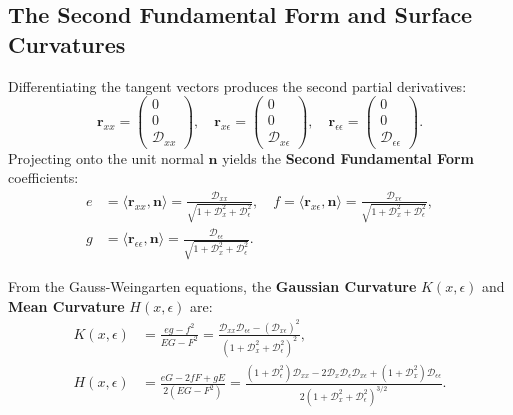 \documentclass[11pt,a4paper]{article}
\theoremstyle{definition}
\begin{document}
\subsection{The Second Fundamental Form and Surface Curvatures}
Differentiating the tangent vectors produces the second partial derivatives:
\begin{equation}
\mathbf{r}_{xx} = \begin{pmatrix} 0 \\ 0 \\ \mathcal{D}_{xx} \end{pmatrix}, \quad \mathbf{r}_{x\epsilon} = \begin{pmatrix} 0 \\ 0 \\ \mathcal{D}_{x\epsilon} \end{pmatrix}, \quad \mathbf{r}_{\epsilon\epsilon} = \begin{pmatrix} 0 \\ 0 \\ \mathcal{D}_{\epsilon\epsilon} \end{pmatrix}.
\end{equation}
Projecting onto the unit normal $\mathbf{n}$ yields the \textbf{Second Fundamental Form} coefficients:
\begin{align}
e &= \langle \mathbf{r}_{xx}, \mathbf{n} \rangle = \frac{\mathcal{D}_{xx}}{\sqrt{1 + \mathcal{D}_x^2 + \mathcal{D}_\epsilon^2}}, \quad 
f = \langle \mathbf{r}_{x\epsilon}, \mathbf{n} \rangle = \frac{\mathcal{D}_{x\epsilon}}{\sqrt{1 + \mathcal{D}_x^2 + \mathcal{D}_\epsilon^2}}, \nonumber \\
g &= \langle \mathbf{r}_{\epsilon\epsilon}, \mathbf{n} \rangle = \frac{\mathcal{D}_{\epsilon\epsilon}}{\sqrt{1 + \mathcal{D}_x^2 + \mathcal{D}_\epsilon^2}}.
\end{align}

From the Gauss-Weingarten equations, the \textbf{Gaussian Curvature} $K(x, \epsilon)$ and \textbf{Mean Curvature} $H(x, \epsilon)$ are:
\begin{align}
K(x, \epsilon) &= \frac{eg - f^2}{EG - F^2} = \frac{\mathcal{D}_{xx} \mathcal{D}_{\epsilon\epsilon} - (\mathcal{D}_{x\epsilon})^2}{\left(1 + \mathcal{D}_x^2 + \mathcal{D}_\epsilon^2\right)^2}, \label{eq:full_gaussian_curvature} \\
H(x, \epsilon) &= \frac{eG - 2fF + gE}{2(EG - F^2)} = \frac{(1 + \mathcal{D}_\epsilon^2)\mathcal{D}_{xx} - 2\mathcal{D}_x \mathcal{D}_\epsilon \mathcal{D}_{x\epsilon} + (1 + \mathcal{D}_x^2)\mathcal{D}_{\epsilon\epsilon}}{2\left(1 + \mathcal{D}_x^2 + \mathcal{D}_\epsilon^2\right)^{3/2}}. \label{eq:full_mean_curvature}
\end{align}
\end{document}
